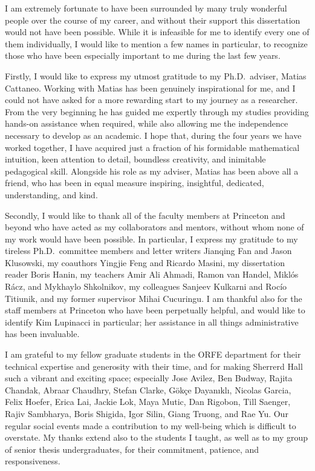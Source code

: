 
I am extremely fortunate to have been surrounded by many truly wonderful people
over the course of my career, and without their support this dissertation would
not have been possible. While it is infeasible for me to identify every one of
them individually, I would like to mention a few names in particular, to
recognize those who have been especially important to me during the last few
years.

Firstly, I would like to express my utmost gratitude to my Ph.D.\ adviser,
Matias Cattaneo. Working with Matias has been genuinely inspirational for me,
and I could not have asked for a more rewarding start to my journey as a
researcher. From the very beginning he has guided me expertly through my
studies providing hands-on assistance when required, while also allowing me the
independence necessary to develop as an academic. I hope that, during the four
years we have worked together, I have acquired just a fraction of his formidable
mathematical intuition, keen attention to detail, boundless creativity, and
inimitable pedagogical skill. Alongside his role as my adviser, Matias has been
above all a friend, who has been in equal measure inspiring,
insightful, dedicated, understanding, and kind.

Secondly, I would like to thank all of the faculty members at Princeton and
beyond who have acted as my collaborators and mentors, without whom none of my
work would have been possible. In particular, I express my gratitude to my
tireless Ph.D.\ committee members and letter writers Jianqing Fan and Jason
Klusowski, my coauthors Yingjie Feng and Ricardo Masini, my dissertation reader
Boris Hanin, my teachers
Amir Ali Ahmadi, Ramon van Handel, Mikl{\'o}s R{\'a}cz, and Mykhaylo Shkolnikov,
my colleagues Sanjeev Kulkarni and Roc{\'i}o Titiunik,
and my former supervisor Mihai Cucuringu.
I am thankful also for the staff members at Princeton who have been
perpetually helpful, and would like to identify Kim
Lupinacci in particular; her assistance in all things administrative has been
invaluable.

I am grateful to my fellow graduate students in the ORFE department for their
technical expertise and generosity with their time, and for making Sherrerd
Hall such a vibrant and exciting space; especially Jose Avilez,
Ben Budway, Rajita Chandak,
Abraar Chaudhry, Stefan Clarke, G{\"o}k{\c c}e Dayan{\i}kl{\i}, Nicolas Garcia,
Felix Hoefer, Erica Lai, Jackie Lok, Maya Mutic, Dan Rigobon, Till Saenger,
Rajiv Sambharya, Boris Shigida, Igor Silin, Giang Truong, and Rae Yu. Our
regular social events made a contribution to my well-being which is difficult
to overstate. My thanks extend also to the students I taught, as
well as to my group of senior thesis undergraduates, for their commitment,
patience, and responsiveness.

